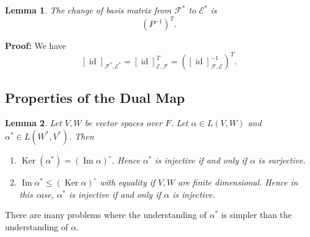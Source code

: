 \documentclass[12pt]{article}
\DeclareMathOperator{\Ker}{Ker}
\DeclareMathOperator{\Img}{Im}
\DeclareMathOperator{\id}{id}
\newtheorem{lemma}{Lemma}[section]
\theoremstyle{definition}
\theoremstyle{remark}
\begin{document}
\begin{lemma}
	The change of basis matrix from $\mathcal{F}^{\ast}$ to $\mathcal{E}^{\ast}$ is
	\[
		(P^{-1})^{T}
	.\]
\end{lemma}
\begin{adjustbox}{minipage = \columnwidth - 25.5pt, margin=1em, frame=1pt, margin=0em}
\textbf{Proof:} We have
\[
	[\id]_{\mathcal{F}^{\ast}, \mathcal{E}^{\ast}} = [\id]_{\mathcal{E}, \mathcal{F}}^{T} = ([\id]_{\mathcal{F}, \mathcal{E}}^{-1})^{T}
.\]
\end{adjustbox}

\subsection{Properties of the Dual Map}%
\label{sub:properties_of_the_dual_map}

\begin{lemma}
	Let $V, W $ be vector spaces over $F$. Let $\alpha \in L(V, W)$ and $\alpha^{\ast} \in L(W^{\ast}, V^{\ast})$. Then
	\begin{enumerate}[\normalfont(i)]
		\item $\Ker(\alpha^{\ast}) = (\Img \alpha)^{\circ}$. Hence $\alpha^{\ast}$ is injective if and only if $\alpha$ is surjective.
		\item $\Img \alpha^{\ast} \leq (\Ker \alpha)^{\circ}$ with equality if $V, W$ are finite dimensional. Hence in this case, $\alpha^{\ast}$ is injective if and only if $\alpha$ is injective.
	\end{enumerate}
\end{lemma}

There are many problems where the understanding of $\alpha^{\ast}$ is simpler than the understanding of $\alpha$.
\end{document}
